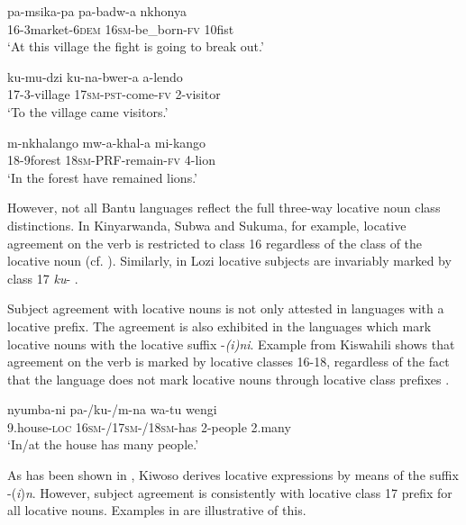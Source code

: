 \documentclass[output=paper]{langscibook}
\begin{document}
\ea%
    \label{ex:mallya:13}
    \ea\label{ex:mallya:13a}
    \gll pa-{msika}-{pa}          {pa}-{badw}-{a}     {nkhonya}\\
    16-3market-6\textsc{dem} 16\textsc{sm}-be\_born-\textsc{fv}  10fist\\
    \glt ‘At this village the fight is going to break out.’

    \ex\label{ex:mallya:13b}
    \gll ku-mu-dzi      ku-na-bwer-a    a-lendo\\
    17-3-village    17\textsc{sm}-\textsc{pst}-come-\textsc{fv}    2-visitor\\
    \glt ‘To the village came visitors.’

    \ex\label{ex:mallya:13c}
    \gll m-nkhalango    mw-a-khal-a        mi-kango\\
    18-9forest          18\textsc{sm}-PRF-remain-\textsc{fv}      4-lion\\
    \glt ‘In the forest have remained lions.’
    \z
\z

However, not all Bantu languages reflect the full three-way locative noun class distinctions. In Kinyarwanda, Subwa and Sukuma, for example, locative agreement on the verb is restricted to class 16 regardless of the class of the locative noun (cf. \citealt{Maho1999}). Similarly, in Lozi locative subjects are invariably marked by class 17 \textit{ku}{}- \citep{MartenEtAl2007}.

Subject agreement with locative nouns is not only attested in languages with a locative prefix. The agreement is also exhibited in the languages which mark locative nouns with the locative suffix -\textit{(i)ni}. Example  from Kiswahili shows that agreement on the verb is marked by locative classes 16-18, regardless of the fact that the language does not mark locative nouns through locative class prefixes \citep[402]{Carstens1997}.

 \ea\label{ex:mallya:14}
 \gll nyumba-ni        pa-/ku-/m-na      wa-tu          wengi\\
    9.house-\textsc{loc}    16\textsc{sm}-/17\textsc{sm}-/18\textsc{sm}-has    2-people    2.many\\
 \glt ‘In/at the house has many people.’
\z

As has been shown in , Kiwoso derives locative expressions by means of the suffix -(\textit{i})\textit{n}. However, subject agreement is consistently with locative class 17 prefix for all locative nouns. Examples in  are illustrative of this.
\end{document}
